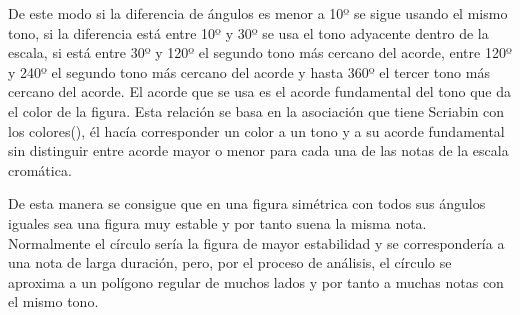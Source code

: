 De este modo si la diferencia de ángulos es menor a 10º se sigue usando el mismo tono, si la diferencia está entre 10º y 30º se usa el tono adyacente dentro de la escala, si está entre 30º y 120º el segundo tono más cercano del acorde, entre 120º y 240º el segundo tono más cercano del acorde y hasta 360º el tercer tono más cercano del acorde. El acorde que se usa es el acorde fundamental del tono que da el color de la figura. Esta relación se basa en la asociación que tiene Scriabin con los colores(\cite{ScriabinQuintasColor}), él hacía corresponder un color a un tono y a su acorde fundamental sin distinguir entre acorde mayor o menor para cada una de las notas de la escala cromática.

De esta manera se consigue que en una figura simétrica con todos sus ángulos iguales sea una figura muy estable y por tanto suena la misma nota. Normalmente el círculo sería la figura de mayor estabilidad y se correspondería a una nota de larga duración, pero, por el proceso de análisis, el círculo se aproxima a un polígono regular de muchos lados y por tanto a muchas notas con el mismo tono.

